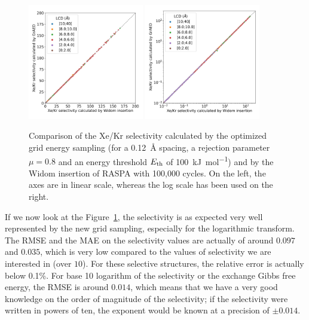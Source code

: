 \documentclass[main]{subfiles}
\begin{document}
\begin{figure}[ht]
  \centering
    \includegraphics[width=0.45\textwidth]{figures/3-fastsim/s_0_widom_vs_s_0_grid_overview.jpg}
    \includegraphics[width=0.45\textwidth]{figures/3-fastsim/s_0_widom_vs_s_0_grid_overview_log.jpg}
    \caption{Comparison of the Xe/Kr selectivity calculated by the optimized grid energy sampling (for a \SI{0.12}{\angstrom} spacing, a rejection parameter $\mu=0.8$ and an energy threshold $E_{\text{th}}$ of \SI{100}{\kilo\joule\per\mole}) and by the Widom insertion of RASPA with 100,000 cycles. On the left, the axes are in linear scale, whereas the log scale has been used on the right. }\label{fgr:grid_widom_selectivity}
\end{figure}

If we now look at the Figure~\ref{fgr:grid_widom_selectivity}, the selectivity is as expected very well represented by the new grid sampling, especially for the logarithmic transform. The RMSE and the MAE on the selectivity values are actually of around $0.097$ and $0.035$, which is very low compared to the values of selectivity we are interested in (over $10$). For these selective structures, the relative error is actually below {0.1\%}. For base 10 logarithm of the selectivity or the exchange Gibbs free energy, the RMSE is around $0.014$, which means that we have a very good knowledge on the order of magnitude of the selectivity; if the selectivity were written in powers of ten, the exponent would be known at a precision of $\pm 0.014$.
\end{document}

